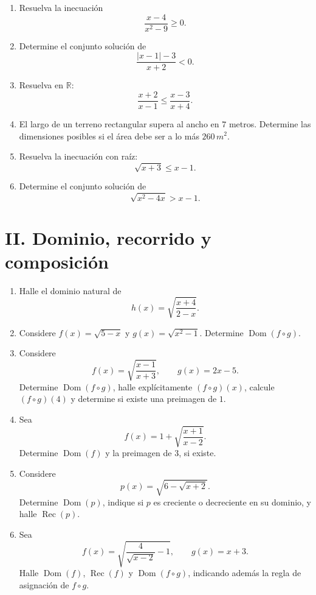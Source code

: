 \documentclass[letterpaper, 12pt]{article}
\newcommand{\R}{\mathbb{R}}
\newcommand{\Dom}{\operatorname{Dom}}
\newcommand{\Rec}{\operatorname{Rec}}
\begin{document}
\begin{enumerate}[label=\color{azulFuerte}\bfseries 1.\arabic*., leftmargin=*, itemsep=1em]
    \item Resuelva la inecuaci\'on
    \[
        \frac{x-4}{x^{2}-9}\geq 0.
    \]

    \item Determine el conjunto soluci\'on de
    \[
        \frac{|x-1|-3}{x+2}<0.
    \]

    \item Resuelva en $\R$:
    \[
        \frac{x+2}{x-1}\leq \frac{x-3}{x+4}.
    \]

    \item El largo de un terreno rectangular supera al ancho en $7$ metros. Determine las dimensiones posibles si el \'area debe ser a lo m\'as $260\,m^2$.

    \item Resuelva la inecuaci\'on con ra\'iz:
    \[
        \sqrt{x+3}\leq x-1.
    \]

    \item Determine el conjunto soluci\'on de
    \[
        \sqrt{x^2-4x}>x-1.
    \]
\end{enumerate}

\section*{II. Dominio, recorrido y composici\'on}

\begin{enumerate}[label=\color{azulFuerte}\bfseries 2.\arabic*., leftmargin=*, itemsep=1em]
    \item Halle el dominio natural de
    \[
        h(x)=\sqrt{\frac{x+4}{2-x}}.
    \]

    \item Considere $f(x)=\sqrt{5-x}$ y $g(x)=\sqrt{x^2-1}$. Determine $\Dom(f\circ g)$.

    \item Considere
    \[
        f(x)=\sqrt{\frac{x-1}{x+3}},
        \qquad
        g(x)=2x-5.
    \]
    Determine $\Dom(f\circ g)$, halle expl\'icitamente $(f\circ g)(x)$, calcule $(f\circ g)(4)$ y determine si existe una preimagen de $1$.

    \item Sea
    \[
        f(x)=1+\sqrt{\frac{x+1}{x-2}}.
    \]
    Determine $\Dom(f)$ y la preimagen de $3$, si existe.

    \item Considere
    \[
        p(x)=\sqrt{6-\sqrt{x+2}}.
    \]
    Determine $\Dom(p)$, indique si $p$ es creciente o decreciente en su dominio, y halle $\Rec(p)$.

    \item Sea
    \[
        f(x)=\sqrt{\frac{4}{\sqrt{x-2}}-1},
        \qquad
        g(x)=x+3.
    \]
    Halle $\Dom(f)$, $\Rec(f)$ y $\Dom(f\circ g)$, indicando adem\'as la regla de asignaci\'on de $f\circ g$.
\end{enumerate}
\end{document}
